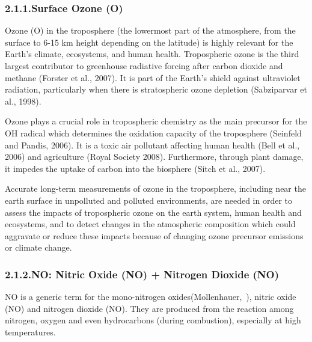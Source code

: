 \documentclass[9pt]{report}
\begin{document}
\subsubsection{2.1.1.\hspace*{0.5em}Surface Ozone (O)}\label{sec-surface-ozone-o3}%

\noindent{}Ozone (O) in the troposphere (the lowermost part of the atmosphere, from the surface to 6-15 km height depending on the latitude) is highly relevant for the Earth’s climate, ecosystems, and human health.
Tropospheric ozone is the third largest contributor to greenhouse radiative forcing after carbon dioxide and methane (Forster et al., 2007).
It is part of the Earth’s shield against ultraviolet radiation, particularly when there is stratospheric ozone depletion (Sabziparvar et al., 1998).%

Ozone plays a crucial role in tropospheric chemistry as the main precursor for the OH radical which determines the oxidation capacity of the troposphere (Seinfeld and Pandis, 2006). 
It is a toxic air pollutant affecting human health (Bell et al., 2006) and agriculture (Royal Society 2008).
Furthermore, through plant damage, it impedes the uptake of carbon into the biosphere (Sitch et al., 2007).%

Accurate long-term measurements of ozone in the troposphere, including near the earth surface in unpolluted and polluted environments, are needed in order to assess the impacts of tropospheric ozone on the earth system, human health and ecosystems, and to detect changes in the atmospheric composition which could aggravate or reduce these impacts because of changing ozone precursor emissions or climate change.%

\subsubsection{2.1.2.\hspace*{0.5em}NO: Nitric Oxide (NO) + Nitrogen Dioxide (NO)}\label{sec-nox--nitric-oxide-no-nitrogen-dioxide-no2}%

\noindent{}NO is a generic term for the mono-nitrogen oxides(Mollenhauer,~), nitric oxide (NO) and nitrogen dioxide (NO).
They are produced from the reaction among nitrogen, oxygen and even hydrocarbons (during combustion), especially at high temperatures.%
\end{document}
